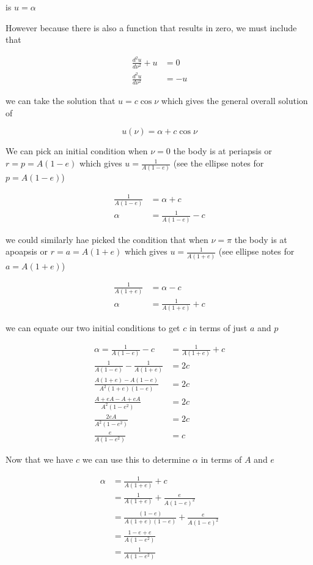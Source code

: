 is $u=\alpha$

However because there is also a function that results in zero, we must include that

\begin{align}
\frac{d^2u}{d\nu^2}+u &=0 \nonumber \\
\frac{d^2u}{d\nu^2} &=-u
\end{align}

we can take the solution that $u=c\cos\nu$ which gives the general overall solution of

\begin{equation}
u(\nu)=\alpha + c \cos \nu
\end{equation}

We can pick an initial condition when $\nu=0$ the body is at periapsis or $r=p=A(1-e)$ which gives $u=\frac{1}{A(1-e)}$ (see the ellipse notes for $p=A(1-e)$)


\begin{align}
\frac{1}{A(1-e)}&=\alpha+c \nonumber \\
\alpha&=\frac{1}{A(1-e)} - c
\end{align}


we could similarly hae picked the condition that when $\nu=\pi$ the body is at apoapsis or $r=a=A(1+e)$ which gives $u=\frac{1}{A(1+e)}$ (see ellipse notes for $a=A(1+e)$)


\begin{align}
\frac{1}{A(1+e)}&=\alpha-c \nonumber \\
\alpha&=\frac{1}{A(1+e)} + c
\end{align}

we can equate our two initial conditions to get $c$ in terms of just $a$ and $p$

\begin{align}
\alpha=\frac{1}{A(1-e)}-c&=\frac{1}{A(1+e)} + c \nonumber \\
\frac{1}{A(1-e)}-\frac{1}{A(1+e)}&=2c \nonumber \\
\frac{A(1+e)-A(1-e)}{A^2(1+e)(1-e)}&=2c \nonumber \\
\frac{A+eA-A+eA}{A^2(1-e^2)}&=2c \nonumber \\
\frac{2eA}{A^2(1-e^2)}&=2c \nonumber \\
\frac{e}{A(1-e^2)}&=c
\end{align}

Now that we have $c$ we can use this to determine $\alpha$ in terms of $A$ and $e$

\begin{align}
\alpha&=\frac{1}{A(1+e)} + c \nonumber \\
&=\frac{1}{A(1+e)} + \frac{e}{A(1-e)^2}\nonumber \\
&=\frac{(1-e)}{A(1+e)(1-e)} + \frac{e}{A(1-e)^2}\nonumber \\
&=\frac{1-e+e}{A(1-e^2)} \nonumber \\
&=\frac{1}{A(1-e^2)} \nonumber
\end{align}

